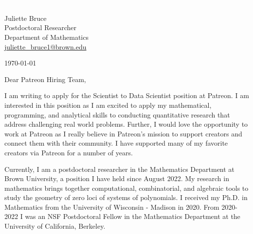 \documentclass[11pt]{article}
\begin{document}
\section*{}

\noindent
\begin{minipage}{0.99\textwidth}
\begin{minipage}{0.69\textwidth}
\textcolor{white}{.}
\end{minipage}
\begin{minipage}{0.29\textwidth}
{
Juliette Bruce \\
Postdoctoral Researcher \\
Department of Mathematics \\
\href{mailto:juliette\_bruce1@brown.edu}{juliette\_bruce1@brown.edu}
}

\vspace{12pt}
\today
\end{minipage}
\end{minipage}


\vspace{12pt}
\noindent
Dear Patreon Hiring Team,

I am writing to apply for the Scientist to Data Scientist position at Patreon. I am interested in this position as I am excited to apply my mathematical, programming, and analytical skills to conducting quantitative research that address challenging real world problems. Further, I would love the opportunity to work at Patreon as I really believe in Patreon's mission to support creators and connect them with their community. I have supported many of my favorite creators via Patreon for a number of years.

Currently, I am a postdoctoral researcher in the Mathematics Department at Brown University, a position I have held since August 2022. My research in mathematics brings together computational, combinatorial, and algebraic tools to study the geometry of zero loci of systems of polynomials. I received my Ph.D. in Mathematics from the University of Wisconsin - Madison in 2020. From 2020-2022 I was an NSF Postdoctoral Fellow in the Mathematics Department at the University of California, Berkeley.
\end{document}
